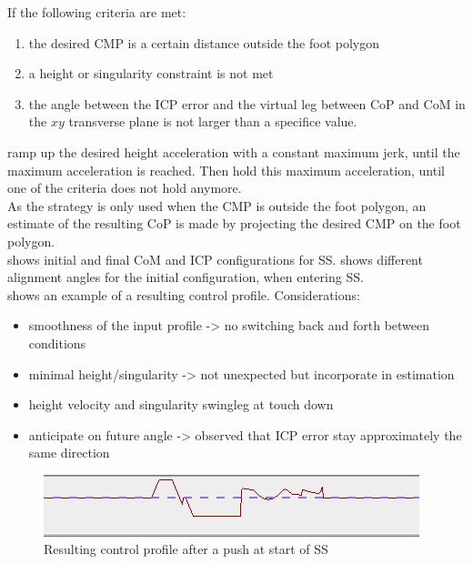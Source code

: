 If the following criteria are met:
\begin{enumerate}
	\item the desired \ac{CMP} is a certain distance outside the foot polygon
	\item a height or singularity constraint is not met
	\item the angle between the ICP error and the virtual leg between \ac{CoP} and \ac{CoM} in the $xy$ transverse plane is not larger than a specifice value.
\end{enumerate}
ramp up the desired height acceleration with a constant maximum jerk, until the maximum acceleration is reached. Then hold this maximum acceleration, until one of the criteria does not hold anymore. \\
As the strategy is only used when the \ac{CMP} is outside the foot polygon, an estimate of the resulting \ac{CoP} is made by projecting the desired \ac{CMP} on the foot polygon.\\
 shows initial and final \ac{CoM} and \ac{ICP} configurations for \ac{SS}.  shows different alignment angles for the initial configuration, when entering \ac{SS}.\\
 shows an example of a resulting control profile.
Considerations:
\begin{itemize}
	\item smoothness of the input profile -> no switching back and forth between conditions
	\item minimal height/singularity -> not unexpected but incorporate in estimation
	\item height velocity and singularity swingleg at touch down
	\item anticipate on future angle -> observed that ICP error stay approximately the same direction
\end{itemize}






\begin{figure}[h]
\centering
  \includegraphics[width=.8\linewidth]{STYLESTUFF/controlProfileConditional.png}
   \caption{Resulting control profile after a push at start of \ac{SS}}
    \label{fig:profile}
\end{figure}

